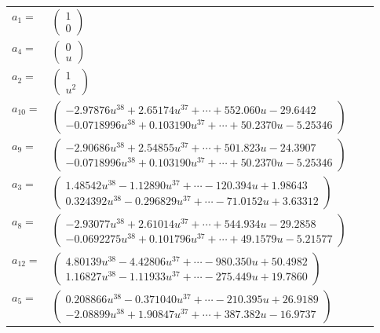 \documentclass[1p]{elsarticle_modified}
\theoremstyle{definition}
\begin{document}
\begin{tabular}{m{7pt} m{180pt} m{7pt} m{180pt} }
\flushright $a_{1}=$&$\begin{pmatrix}1\\0\end{pmatrix}$ \\
\flushright $a_{4}=$&$\begin{pmatrix}0\\u\end{pmatrix}$ \\
\flushright $a_{2}=$&$\begin{pmatrix}1\\u^2\end{pmatrix}$ \\
\flushright $a_{10}=$&$\begin{pmatrix}-2.97876 u^{38}+2.65174 u^{37}+\cdots+552.060 u-29.6442\\-0.0718996 u^{38}+0.103190 u^{37}+\cdots+50.2370 u-5.25346\end{pmatrix}$ \\
\flushright $a_{9}=$&$\begin{pmatrix}-2.90686 u^{38}+2.54855 u^{37}+\cdots+501.823 u-24.3907\\-0.0718996 u^{38}+0.103190 u^{37}+\cdots+50.2370 u-5.25346\end{pmatrix}$ \\
\flushright $a_{3}=$&$\begin{pmatrix}1.48542 u^{38}-1.12890 u^{37}+\cdots-120.394 u+1.98643\\0.324392 u^{38}-0.296829 u^{37}+\cdots-71.0152 u+3.63312\end{pmatrix}$ \\
\flushright $a_{8}=$&$\begin{pmatrix}-2.93077 u^{38}+2.61014 u^{37}+\cdots+544.934 u-29.2858\\-0.0692275 u^{38}+0.101796 u^{37}+\cdots+49.1579 u-5.21577\end{pmatrix}$ \\
\flushright $a_{12}=$&$\begin{pmatrix}4.80139 u^{38}-4.42806 u^{37}+\cdots-980.350 u+50.4982\\1.16827 u^{38}-1.11933 u^{37}+\cdots-275.449 u+19.7860\end{pmatrix}$ \\
\flushright $a_{5}=$&$\begin{pmatrix}0.208866 u^{38}-0.371040 u^{37}+\cdots-210.395 u+26.9189\\-2.08899 u^{38}+1.90847 u^{37}+\cdots+387.382 u-16.9737\end{pmatrix}$ \\

\end{tabular}
\end{document}
